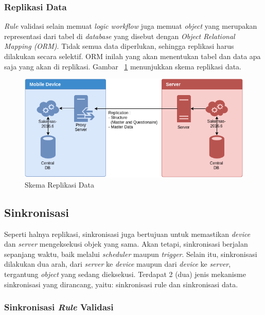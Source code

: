 \subsubsection{Replikasi Data}

\textit{Rule} validasi selain memuat \textit{logic workflow} juga memuat \textit{object} yang merupakan representasi dari tabel di \textit{database} yang disebut dengan \textit{Object Relational Mapping (ORM)}. Tidak semua data diperlukan, sehingga replikasi harus dilakukan secara selektif. ORM inilah yang akan menentukan tabel dan data apa saja yang akan di replikasi. Gambar ~\ref{fig:architecture-data-replication} menunjukkan skema replikasi data.

\begin{figure}[h]
    \centering
    \includegraphics[width=.93\textwidth]{../../Resources/Images/architecture-data-replication}
    \caption{Skema Replikasi Data}
    \label{fig:architecture-data-replication}
\end{figure}


\subsection{Sinkronisasi}

Seperti halnya replikasi, sinkronisasi juga bertujuan untuk memastikan \textit{device} dan \textit{server} mengeksekusi objek yang sama. Akan tetapi, sinkronisasi berjalan sepanjang waktu, baik melalui \textit{scheduler} maupun \textit{trigger}. Selain itu, sinkronisasi dilakukan dua arah, dari \textit{server} ke \textit{device} maupun dari \textit{device} ke \textit{server}, tergantung \textit{object} yang sedang dieksekusi. Terdapat 2 (dua) jenis mekanisme sinkronisasi yang dirancang, yaitu: sinkronisasi rule dan sinkronisasi data.


\subsubsection{Sinkronisasi \textit{Rule} Validasi}

